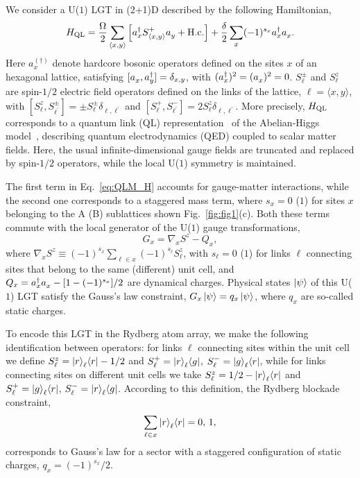 \documentclass[footinbib,a4paper,aps,superscriptaddress,twocolumn,preprintnumbers,amsmath,amssymb,nobalancelastpage,10pt,prl]{revtex4-2}
\begin{document}
{We consider a U($1$) LGT in (2+1)D described by the following Hamiltonian,
\begin{equation}
\label{eq:QLM_H}
    H_{\rm QL} = \frac{\Omega}{2} \sum_{\langle x,y\rangle} \left[a^\dagger_x S^+_{\langle x,y \rangle}a^{\vphantom{\dagger}}_y + \text{H.c.}\right] + \frac{\delta}{2}\sum_x (-1)^{s_x} a^\dagger_x a^{\vphantom{\dagger}}_x.
\end{equation}
Here $a^{(\dagger)}_x$ denote hardcore bosonic operators defined on the sites $x$ of an hexagonal lattice, satisfying $[a^{\vphantom{\dagger}}_x, a^\dagger_{y}] = \delta_{x,y}$, with $(a^\dagger_x)^2=(a^{\vphantom{\dagger}}_x)^2=0$. $S^\pm_\ell$ and $S^z_\ell$ are spin-$1/2$ electric field operators defined on the links of the lattice, $\ell = \langle x,y \rangle$, with $[S^z_\ell, S^{\pm}_{\ell^\prime}] =\pm S^{\pm}_\ell\delta_{\ell,\ell^\prime}$ and $[S^+_\ell,S^-_{\ell^\prime}] = 2S^z_\ell\delta_{\ell,\ell^\prime}$. More precisely, $H_{\rm QL}$ corresponds to a quantum link (QL) representation~\cite{Chandrasekharan_1997, Wiese_2013} of the Abelian-Higgs model~\cite{Fradkin_1979, Gonzalez_2017}, describing quantum electrodynamics (QED) coupled to scalar matter fields. Here, the usual infinite-dimensional gauge fields are truncated and replaced by spin-$1/2$ operators, while the local U($1$) symmetry is maintained.

The first term in Eq.~\eqref{eq:QLM_H} accounts for gauge-matter interactions, while the second one corresponds to a staggered mass term, where $s_x = 0$ ($1$) for sites $x$ belonging to the A (B) sublattices shown Fig.~\ref{fig:fig1}(c). Both these terms commute with the local generator of the U($1$) gauge transformations,
\begin{equation}
    G_x = \nabla_x S^z - Q_x,
\end{equation}
where $\nabla_x S^z \equiv (-1)^{s_x}\sum_{\ell\in x} (-1)^{s_\ell} S^z_\ell$, with $s_\ell = 0$ ($1$) for links $\ell$ connecting sites that belong to the same (different) unit cell, and $Q_x = a^\dagger_x a^{\vphantom{\dagger}}_{x} - [1 - (-1)^{s_x}]/2$ are dynamical charges. Physical states $\ket{\psi}$ of this U($1$) LGT satisfy the Gauss's law constraint, $G_x\ket{\psi} = q_x\ket{\psi}$, where $q_x$ are so-called static charges. 

To encode this LGT in the Rydberg atom array, we make the following identification between operators: for links $\ell$ connecting sites within the unit cell we define $S^z_\ell = \ket{r}_\ell\!\bra{r} - 1/2$ and $S^{+}_\ell = \ket{r}_\ell\!\bra{g}$, $S^{-}_\ell = \ket{g}_\ell\!\bra{r}$, while for links connecting sites on different unit cells we take $S^z_\ell = 1/2 - \ket{r}_\ell\!\bra{r}$ and $S^{+}_\ell = \ket{g}_\ell\!\bra{r}$, $S^{-}_\ell = \ket{r}_\ell\!\bra{g}$. According to this definition, the Rydberg blockade constraint,
\begin{equation}
\sum_{\ell\in x} \ket{r}_\ell\!\bra{r} = 0, \, 1,
\end{equation}
corresponds to Gauss's law for a sector with a staggered configuration of static charges, $q_x = (-1)^{s_x}/2$.

}
\end{document}

